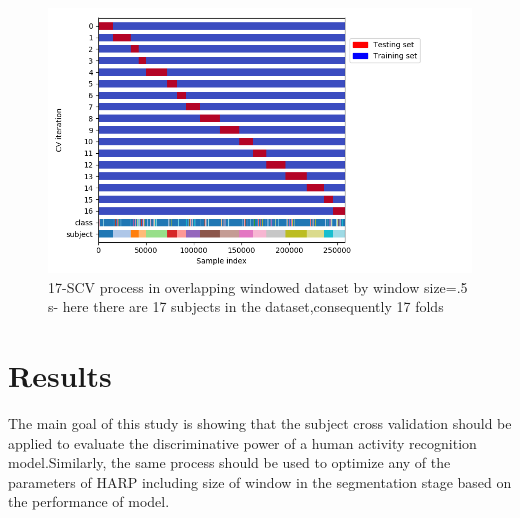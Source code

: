\begin{figure}[h]
    \centering
    \includegraphics[width=.5\textwidth]{Figures/LeaveOneGroupOut.png}
    \caption{17-SCV process in overlapping windowed dataset by window size=.5 s- here there are 17 subjects in the dataset,consequently 17 folds  }
    \label{fig:Subjective-cv}
\end{figure}


\section{Results}
The main goal of this study is showing that the subject cross validation should be applied to evaluate the discriminative power of a human activity recognition model.Similarly, the same process should be used to optimize any of the parameters of HARP including size of window in the segmentation stage based on the performance of model.%




